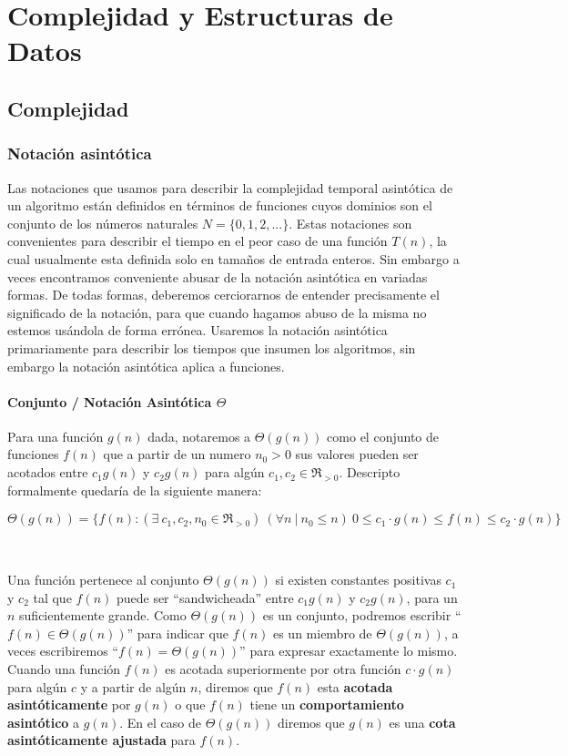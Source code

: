 \chapter{Complejidad y Estructuras de Datos}

\section{Complejidad}
\subsection{Notaci\'on asint\'otica}

Las notaciones que usamos para describir la complejidad temporal asint\'otica de un algoritmo est\'an definidos en t\'erminos de funciones cuyos dominios son el conjunto de los n\'umeros naturales $N = \{0,1,2,...\}$. Estas notaciones son convenientes para describir el tiempo en el peor caso de una funci\'on $T(n)$, la cual usualmente esta definida solo en tama\~nos de entrada enteros. Sin embargo a veces encontramos conveniente abusar de la notaci\'on asint\'otica en variadas formas. De todas formas, deberemos cerciorarnos de entender precisamente el significado de la notaci\'on, para que cuando hagamos abuso de la misma no estemos us\'andola de forma err\'onea. Usaremos la notaci\'on asint\'otica primariamente para describir los tiempos que insumen los algoritmos, sin embargo la notaci\'on asint\'otica aplica a funciones.

\subsubsection{Conjunto / Notaci\'on Asint\'otica $\Theta$}

Para una funci\'on $g(n)$ dada, notaremos a $\Theta(g(n))$ como el conjunto de funciones $f(n)$ que a partir de un numero $n_0 > 0$ sus valores pueden ser acotados entre $c_1g(n)$ y $c_2g(n)$ para alg\'un $c_1, c_2 \in \Re_{>0}$. Descripto formalmente quedar\'ia de la siguiente manera:

\begin{equation*}
 \Theta(g(n)) = \{ f(n) : (\exists\ c_1, c_2, n_0 \in \Re_{>0}) \ (\forall n\ |\ n_0 \leq n)\ 0 \leq c_1 \cdot g(n) \leq f(n) \leq c_2 \cdot g(n) \}
\end{equation*}

~

Una funci\'on pertenece al conjunto $\Theta(g(n))$ si existen constantes positivas $c_1$ y $c_2$ tal que $f(n)$ puede ser ``sandwicheada'' entre $c_1g(n)$ y $c_2g(n)$, para un $n$ suficientemente grande. Como $\Theta(g(n))$ es un conjunto, podremos escribir ``$f(n) \in \Theta(g(n))$'' para indicar que $f(n)$ es un miembro de $\Theta(g(n))$, a veces escribiremos ``$f(n) = \Theta(g(n))$'' para expresar exactamente lo mismo. Cuando una funci\'on $f(n)$ es acotada superiormente por otra funci\'on $c \cdot g(n)$ para alg\'un $c$ y a partir de alg\'un $n$, diremos que $f(n)$ esta \textbf{acotada asint\'oticamente} por $g(n)$ o que $f(n)$ tiene un \textbf{comportamiento asint\'otico} a $g(n)$. En el caso de $\Theta(g(n))$ diremos que $g(n)$ es una \textbf{cota asint\'oticamente ajustada} para $f(n)$.

